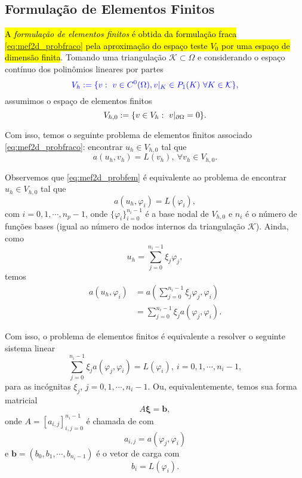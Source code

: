 \subsection{Formulação de Elementos Finitos}
\badgeRevisar

\hl{A \emph{formulação de elementos finitos} é obtida da formulação fraca {\eqref{eq:mef2d_probfraco}} pela aproximação do espaço teste $V_0$ por uma espaço de dimensão finita}. Tomando uma triangulação $\mathcal{K}\subset\Omega$ e considerando o espaço contínuo dos polinômios lineares por partes
\begin{equation}\color{blue}V_h := \{v:~v\in C^0(\Omega), v|_K\in P_1(K)~\forall K\in\mathcal{K}\},
\end{equation}
assumimos o espaço de elementos finitos
\begin{equation}
  V_{h,0}:= \{v\in V_h:~v|_{\partial\Omega}=0\}.
\end{equation}
  
Com isso, temos o seguinte problema de elementos finitos associado \eqref{eq:mef2d_probfraco}: encontrar $u_h\in V_{h,0}$ tal que
\begin{equation}\label{eq:mef2d_probfem}
  a(u_h,v_h) = L(v_h),~\forall v_h\in V_{h,0}.
\end{equation}

Observemos que \eqref{eq:mef2d_probfem} é equivalente ao problema de encontrar $u_h\in V_{h,0}$ tal que
\begin{equation}\label{eq:mef2d_proba1}
  a(u_h,\varphi_i) = L(\varphi_i),
\end{equation}
com $i=0, 1, \cdots, n_p-1$, onde $\{\varphi_i\}_{i=0}^{n_i-1}$ é a base nodal de $V_{h,0}$ e $n_i$ é o número de funções bases (igual ao número de nodos internos da triangulação $\mathcal{K}$). Ainda, como
\begin{equation}
  u_h = \sum_{j=0}^{n_i-1} \xi_j\varphi_j,
\end{equation}
temos 
\begin{align}
  a(u_h, \varphi_i) &= a\left(\sum_{j=0}^{n_i-1}\xi_j\varphi_j,\varphi_i\right) \\
  &= \sum_{j=0}^{n_i-1}\xi_ja(\varphi_j,\varphi_i).
\end{align}

Com isso, o problema de elementos finitos é equivalente a resolver o seguinte sistema linear
\begin{equation}
  \sum_{j=0}^{n_i-1}\xi_ja(\varphi_j,\varphi_i) = L(\varphi_i),~i=0, 1, \cdots, n_i-1,
\end{equation}
para as incógnitas $\xi_j$, $j=0, 1, \cdots, n_i-1$. Ou, equivalentemente, temos sua forma matricial
\begin{equation}
  A\pmb{\xi} = \pmb{b},
\end{equation}
onde $A = [a_{i,j}]_{i,j=0}^{n_i-1}$ é chamada de  com
\begin{equation}
  a_{i,j} = a(\varphi_j, \varphi_i)
\end{equation}
e $\pmb{b} = (b_0, b_1, \cdots, b_{n_i-1})$ é o vetor de carga com
\begin{equation}
  b_i = L(\varphi_i).
\end{equation}

